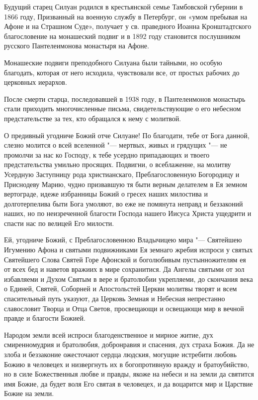 \mychapterending


\begin{mymulticols}


Будущий старец Силуан родился в крестьянской семье Тамбовской губернии в 1866 году, Призванный на военную службу в Петербург, он «умом пребывая на Афоне и на Страшном Суде», получает у св. праведного Иоанна Кронштадтского благословение на монашеский подвиг и в 1892 году становится послушником русского Пантелеимонова монастыря на Афоне.


Монашеские подвиги преподобного Силуана были тайными, но особую благодать, которая от него исходила, чувствовали все, от простых рабочих до церковных иерархов.


После смерти старца, последовавшей в 1938 году, в Пантелеимонов монастырь стали приходить многочисленные письма, свидетельствующие о его небесном предстательстве за тех, кто обращался к нему с молитвой.




О предивный угодниче Божий отче Силуане! По благодати, тебе от Бога данной, слезно молится о всей вселенной "--- мертвых, живых и грядущих "--- не промолчи за нас ко Господу, к тебе усердно припадающих и твоего предстательства умильно просящих. Подвигни, о всеблаженне, на молитву Усердную Заступницу рода христианскаго, Преблагословенную Богородицу и Приснодеву Марию, чудно призвавшую тя быти верным делателем в Ея земном вертограде, идеже избранницы Божий о гресех наших милостива и долготерпелива быти Бога умоляют, во еже не помянута неправд и беззаконий наших, но по неизреченной благости Господа нашего Иисуса Христа ущедрити и спасти нас по велицей Его милости.


Ей, угодниче Божий, с Преблагословенною Владычицею мира "--- Святейшею Игумению Афона и святыми подвижниками Ея земнаго жребия испроси у святых Святейшего Слова Святей Горе Афонской и боголюбивым пустынножителям ея от всех бед и наветов вражиих в мире сохранитися. Да Ангелы святыми от зол избавляеми и Духом Святым в вере и братолюбии укрепляеми, до скончания века о Единей, Святей, Соборней и Апостольстей Церкви молитвы творят и всем спасительный путь указуют, да Церковь Земная и Небесная непрестанно славословит Творца и Отца Светов, просвещающи и освещающи мир в вечной правде и благости Божией.


Народом земли всей испроси благоденственное и мирное житие, дух смиренномудрия и братолюбия, добронравия и спасения, дух страха Божия. Да не злоба и беззаконие ожесточают сердца людския, могущие истребити любовь Божию в человецех и низвергнуть их в богопротивную вражду и братоубийство, но в силе Божественныя любве и правды, якоже на небеси и на земли да святится имя Божие, да будет воля Его святая в человецех, и да воцарится мир и Царствие Божие на земли.



\end{mymulticols}

